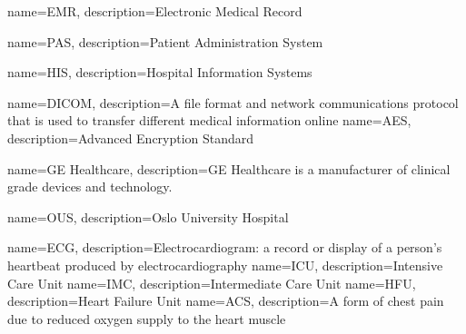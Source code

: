 {
    name=EMR,
    description={Electronic Medical Record}
}

{
    name=PAS,
    description={Patient Administration System}
}

{
    name=HIS,
    description={Hospital Information Systems}
}

{
    name=DICOM,
    description={A file format and network communications protocol that is used to transfer different medical information online}
}
{
    name=AES,
    description={Advanced Encryption Standard}
}

{
    name=GE Healthcare,
    description={GE Healthcare is a manufacturer of clinical grade devices and technology.}
}

{
    name=OUS,
    description={Oslo University Hospital}
}

{
    name=ECG,
    description={Electrocardiogram: a record or display of a person's heartbeat produced by electrocardiography}
}
{
    name=ICU,
    description={Intensive Care Unit}
}
{
    name=IMC,
    description={Intermediate Care Unit}
}
{
    name=HFU,
    description={Heart Failure Unit}
}
{
    name=ACS,
    description={A form of chest pain due to reduced oxygen supply to the heart muscle}
}